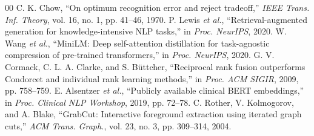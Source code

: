 \documentclass[conference]{IEEEtran}
\begin{document}
\begin{thebibliography}{00}
 C. K. Chow, ``On optimum recognition error and reject tradeoff,'' \textit{IEEE Trans. Inf. Theory}, vol. 16, no. 1, pp. 41--46, 1970.
 P. Lewis \textit{et al.}, ``Retrieval-augmented generation for knowledge-intensive NLP tasks,'' in \textit{Proc. NeurIPS}, 2020.
 W. Wang \textit{et al.}, ``MiniLM: Deep self-attention distillation for task-agnostic compression of pre-trained transformers,'' in \textit{Proc. NeurIPS}, 2020.
 G. V. Cormack, C. L. A. Clarke, and S. B\"uttcher, ``Reciprocal rank fusion outperforms Condorcet and individual rank learning methods,'' in \textit{Proc. ACM SIGIR}, 2009, pp. 758--759.
 E. Alsentzer \textit{et al.}, ``Publicly available clinical BERT embeddings,'' in \textit{Proc. Clinical NLP Workshop}, 2019, pp. 72--78.
 C. Rother, V. Kolmogorov, and A. Blake, ``GrabCut: Interactive foreground extraction using iterated graph cuts,'' \textit{ACM Trans. Graph.}, vol. 23, no. 3, pp. 309--314, 2004.
\end{thebibliography}
\end{document}
